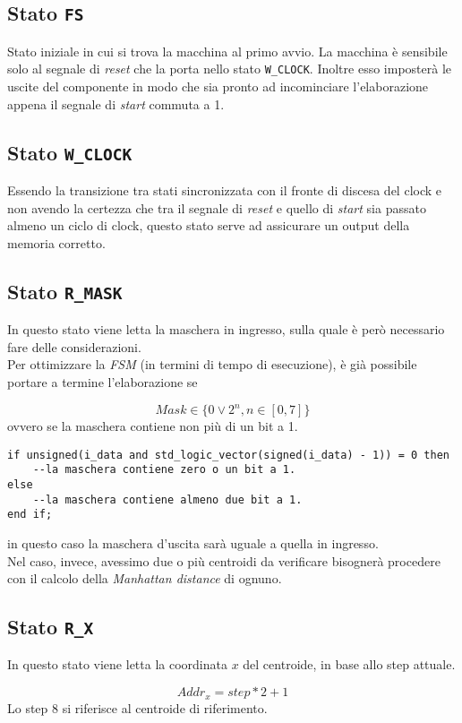\documentclass[a4paper]{report}
\begin{document}
\subsection{Stato \texttt{FS}}
Stato iniziale in cui si trova la macchina al primo avvio. La macchina è sensibile solo al segnale di {\it reset} che la porta nello stato \texttt{W\_CLOCK}. Inoltre esso imposterà le uscite del componente in modo che sia pronto ad incominciare l'elaborazione appena il segnale di {\it start} commuta a 1.

\subsection{Stato \texttt{W\_CLOCK}}
Essendo la transizione tra stati sincronizzata con il fronte di discesa del clock e non avendo la certezza che tra il segnale di {\it reset} e quello di {\it start} sia passato almeno un ciclo di clock, questo stato serve ad assicurare un output della memoria corretto.

\subsection{Stato \texttt{R\_MASK}}
In questo stato viene letta la maschera in ingresso, sulla quale è però necessario fare delle considerazioni.\\
Per ottimizzare la {\it FSM} (in termini di tempo di esecuzione), è già possibile portare a termine l'elaborazione se

\[Mask \in \{0 \lor 2^n, n\in[0,7]\}\]
ovvero se la maschera contiene non più di un bit a 1.\cite{bit_hacks}
\begin{verbatim}
if unsigned(i_data and std_logic_vector(signed(i_data) - 1)) = 0 then
    --la maschera contiene zero o un bit a 1.
else
    --la maschera contiene almeno due bit a 1.
end if;
\end{verbatim}
in questo caso la maschera d'uscita sarà uguale a quella in ingresso.\bigskip\\
Nel caso, invece, avessimo due o più centroidi da verificare bisognerà procedere con il calcolo della {\it Manhattan distance} di ognuno.

\subsection{Stato \texttt{R\_X}}
In questo stato viene letta la coordinata $x$ del centroide, in base allo step attuale.

\[Addr_{x} = step * 2 + 1\]
Lo step 8 si riferisce al centroide di riferimento.
\end{document}
